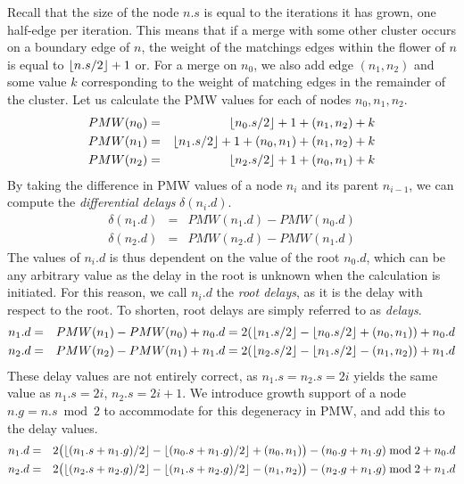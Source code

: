 Recall that the size of the node $n.s$ is equal to the iterations it has grown, one half-edge per iteration. This means that if a merge with some other cluster occurs on a boundary edge of $n$, the weight of the matchings edges within the flower of $n$ is equal to ${\left \lfloor n.s/2 \right \rfloor }+1$ or. For a merge on $n_0$, we also add edge $(n_1,n_2)$ and some value $k$ corresponding to the weight of matching edges in the remainder of the cluster. Let us calculate the PMW values for each of nodes $n_0, n_1, n_2$.
\begin{eqnarray*}
  PMW(n_0) &=& {\left \lfloor n_0.s/2 \right \rfloor }+1 + (n_1,n_2) + k \\
  PMW(n_1) &=& {\left \lfloor n_1.s/2 \right \rfloor }+1 + (n_0,n_1) + (n_1,n_2)+ k \\
  PMW(n_2) &=& {\left \lfloor n_2.s/2 \right \rfloor }+1 + (n_0,n_1) +k
\end{eqnarray*}
By taking the difference in PMW values of a node $n_i$ and its parent $n_{i-1}$, we can compute the \emph{differential delays} $\delta(n_i.d)$.
\begin{eqnarray*}
  \delta(n_1.d) &=& PMW(n_1.d) - PMW(n_0.d) \\
  \delta(n_2.d) &=& PMW(n_2.d) - PMW(n_1.d)
\end{eqnarray*}
The values of $n_i.d$ is thus dependent on the value of the root $n_0.d$, which can be any arbitrary value as the delay in the root is unknown when the calculation is initiated. For this reason, we call $n_i.d$ the \emph{root delays}, as it is the delay with respect to the root. To shorten, root delays are simply referred to as \emph{delays}.
\begin{eqnarray*}
  n_1.d &=& PMW(n_1) - PMW(n_0) + n_0.d = 2({\left \lfloor n_1.s/2 \right \rfloor } - {\left \lfloor n_0.s/2 \right \rfloor } + (n_0,n_1)) + n_0.d \\
  n_2.d &=& PMW(n_2) - PMW(n_1) + n_1.d = 2({\left \lfloor n_2.s/2 \right \rfloor } - {\left \lfloor n_1.s/2 \right \rfloor } - (n_1,n_2)) + n_1.d
\end{eqnarray*}
These delay values are not entirely correct, as $n_1.s = n_2.s = 2i$ yields the same value as  $n_1.s = 2i$, $n_2.s = 2i + 1$. We introduce growth support of a node $n.g = n.s \bmod 2$ to accommodate for this degeneracy in PMW, and add this to the delay values.
\begin{eqnarray*}
  n_1.d &=& 2\big({\left \lfloor (n_1.s+n_1.g)/2 \right \rfloor } - {\left \lfloor (n_0.s+n_1.g)/2 \right \rfloor } + (n_0,n_1)\big) - (n_0.g + n_1.g)\bmod 2 + n_0.d \\
  n_2.d &=& 2\big({\left \lfloor (n_2.s+n_2.g)/2 \right \rfloor } - {\left \lfloor (n_1.s+n_2.g)/2 \right \rfloor } - (n_1,n_2)\big) - (n_2.g + n_1.g)\bmod 2 + n_1.d
\end{eqnarray*}
